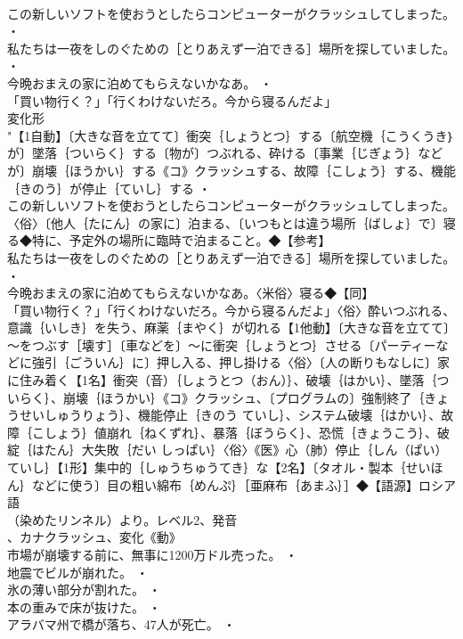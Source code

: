 \documentclass[8pt]{extreport}
\begin{document}
\begin{CJK}{UTF8}{min}
\\	この新しいソフトを使おうとしたらコンピューターがクラッシュしてしまった。 ・
\\	私たちは一夜をしのぐための［とりあえず一泊できる］場所を探していました。 ・
\\	今晩おまえの家に泊めてもらえないかなあ。 ・
\\	「買い物行く？」「行くわけないだろ。今から寝るんだよ」
\\	変化形 
\\	"【1自動】〔大きな音を立てて〕衝突｛しょうとつ｝する〔航空機｛こうくうき｝が〕墜落｛ついらく｝する〔物が〕つぶれる、砕ける〔事業｛じぎょう｝などが〕崩壊｛ほうかい｝する《コ》クラッシュする、故障｛こしょう｝する、機能｛きのう｝が停止｛ていし｝する ・
\\	この新しいソフトを使おうとしたらコンピューターがクラッシュしてしまった。〈俗〉〔他人｛たにん｝の家に〕泊まる、〔いつもとは違う場所｛ばしょ｝で〕寝る◆特に、予定外の場所に臨時で泊まること。◆【参考】
\\	私たちは一夜をしのぐための［とりあえず一泊できる］場所を探していました。 ・
\\	今晩おまえの家に泊めてもらえないかなあ。〈米俗〉寝る◆【同】
\\	「買い物行く？」「行くわけないだろ。今から寝るんだよ」〈俗〉酔いつぶれる、意識｛いしき｝を失う、麻薬｛まやく｝が切れる【1他動】〔大きな音を立てて〕～をつぶす［壊す］〔車などを〕～に衝突｛しょうとつ｝させる〔パーティーなどに強引｛ごういん｝に〕押し入る、押し掛ける〈俗〉〔人の断りもなしに〕家に住み着く【1名】衝突（音）｛しょうとつ（おん）｝、破壊｛はかい｝、墜落｛ついらく｝、崩壊｛ほうかい｝《コ》クラッシュ、〔プログラムの〕強制終了｛きょうせいしゅうりょう｝、機能停止｛きのう ていし｝、システム破壊｛はかい｝、故障｛こしょう｝値崩れ｛ねくずれ｝、暴落｛ぼうらく｝、恐慌｛きょうこう｝、破綻｛はたん｝大失敗｛だい しっぱい｝〈俗〉《医》心（肺）停止｛しん（ぱい）ていし｝【1形】集中的｛しゅうちゅうてき｝な【2名】〔タオル・製本｛せいほん｝などに使う〕目の粗い綿布｛めんぷ｝［亜麻布｛あまふ｝］◆【語源】ロシア語
\\	（染めたリンネル）より。レベル2、発音
\\	、カナクラッシュ、変化《動》
\\	市場が崩壊する前に、無事に1200万ドル売った。 ・
\\	地震でビルが崩れた。 ・
\\	氷の薄い部分が割れた。 ・
\\	本の重みで床が抜けた。 ・
\\	アラバマ州で橋が落ち、47人が死亡。 ・

\end{CJK}
\end{document}
